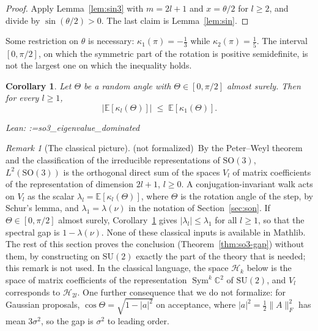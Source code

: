 \documentclass[11pt]{amsart}
\makeatletter
\newtheorem{corollary}[theorem]{Corollary}
\theoremstyle{definition}
\theoremstyle{remark}
\newtheorem{remark}[theorem]{Remark}
\newcommand{\@leanlist}[1]{\def\@leansep{}\@for\@leanname:=#1\do{\@leansep
  \texttt{\expandafter\detokenize\expandafter{\@leanname}}\def\@leansep{, }}}
\newcommand{\lean}[1]{\par\smallskip\noindent
  {\footnotesize\normalfont\raggedright\textsf{Lean:} \@leanlist{#1}\par}}
\newcommand{\notformal}{\textup{(not formalized)}}
\newcommand{\C}{\mathbb{C}}
\newcommand{\E}{\mathbb{E}}
\newcommand{\SO}{\mathrm{SO}}
\newcommand{\fro}[1]{\lVert #1\rVert_{F}}
\makeatother
\begin{document}
\begin{proof}
Apply Lemma~\ref{lem:sin3} with $m=2l+1$ and $x=\theta/2$ for $l\ge2$, and divide by
$\sin(\theta/2)>0$.  The last claim is Lemma~\ref{lem:sin}.
\end{proof}

Some restriction on $\theta$ is necessary: $\kappa_1(\pi)=-\tfrac13$ while
$\kappa_2(\pi)=\tfrac15$.  The interval $[0,\pi/2]$, on which the symmetric part of the rotation
is positive semidefinite, is not the largest one on which the inequality holds.

\begin{corollary}\label{cor:so3}
Let $\Theta$ be a random angle with $\Theta\in[0,\pi/2]$ almost surely.  Then for every $l\ge1$,
\[
  \bigl|\E[\kappa_l(\Theta)]\bigr|\;\le\;\E[\kappa_1(\Theta)].
\]
\lean{so3_eigenvalue_dominated}
\end{corollary}

\begin{remark}[The classical picture]\label{rem:so3-classical}
\notformal\ By the Peter--Weyl theorem and the classification of the irreducible representations
of $\SO(3)$, $L^2(\SO(3))$ is the orthogonal direct sum of the spaces $V_l$ of matrix
coefficients of the representation of dimension $2l+1$, $l\ge0$.  A conjugation-invariant walk
acts on $V_l$ as the scalar $\lambda_l=\E[\kappa_l(\Theta)]$, where $\Theta$ is the rotation
angle of the step, by Schur's lemma, and $\lambda_1=\lambda(\nu)$ in the notation of
Section~\ref{sec:son}.  If $\Theta\in[0,\pi/2]$ almost surely, Corollary~\ref{cor:so3} gives
$|\lambda_l|\le\lambda_1$ for all $l\ge1$, so that the spectral gap is $1-\lambda(\nu)$.  None of
these classical inputs is available in Mathlib.  The rest of this section proves the conclusion
(Theorem~\ref{thm:so3-gap}) without them, by constructing on $\mathrm{SU}(2)$ exactly the part of
the theory that is needed; this remark is not used.  In the classical language, the space
$\mathcal H_k$ below is the space of matrix coefficients of the representation
$\operatorname{Sym}^k\C^2$ of $\mathrm{SU}(2)$, and $V_l$ corresponds to $\mathcal H_{2l}$.  One
further consequence that we do not formalize: for Gaussian proposals,
$\cos\Theta=\sqrt{1-|a|^2}$ on acceptance, where $|a|^2=\tfrac12\fro{A}^2$ has mean $3\sigma^2$,
so the gap is $\sigma^2$ to leading order.
\end{remark}
\end{document}
